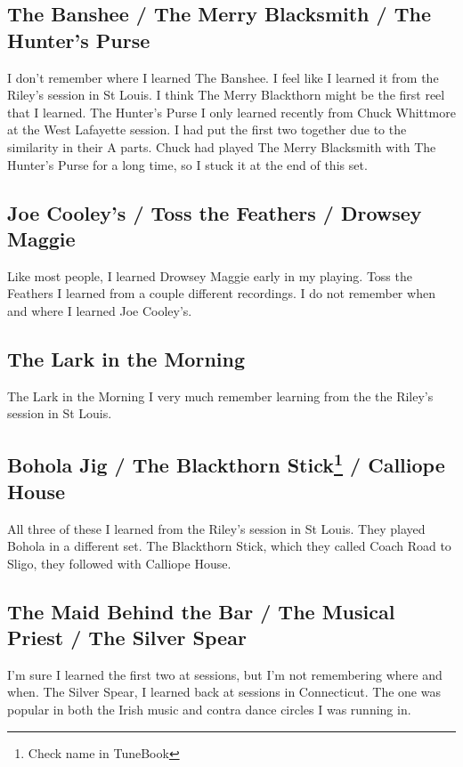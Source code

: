 \documentclass[11pt,letterpaper]{article}
\begin{document}
\subsection*{The Banshee / The Merry Blacksmith / The Hunter's Purse}

I don't remember where I learned The Banshee. I feel like I learned it from the Riley's session in St Louis. I think The Merry Blackthorn might be the first reel that I learned. The Hunter's Purse I only learned recently from Chuck Whittmore at the West Lafayette session. I had put the first two together due to the similarity in their A parts. Chuck had played The Merry Blacksmith with The Hunter's Purse for a long time, so I stuck it at the end of this set.

\subsection*{Joe Cooley's / Toss the Feathers / Drowsey Maggie}

Like most people, I learned Drowsey Maggie early in my playing. Toss the Feathers I learned from a couple different recordings. I do not remember when and where I learned Joe Cooley's. 

\subsection*{The Lark in the Morning}

The Lark in the Morning I very much remember learning from the the Riley's session in St Louis.

\subsection*{Bohola Jig / The Blackthorn Stick\footnote{Check name in TuneBook} / Calliope House}

All three of these I learned from the Riley's session in St Louis. They played Bohola in a different set. The Blackthorn Stick, which they called Coach Road to Sligo, they followed with Calliope House.

\subsection*{The Maid Behind the Bar / The Musical Priest / The Silver Spear}

I'm sure I learned the first two at sessions, but I'm not remembering where and when. The Silver Spear, I learned back at sessions in Connecticut. The one was popular in both the Irish music and contra dance circles I was running in. 
\end{document}
